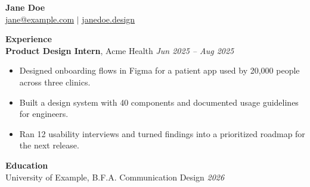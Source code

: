 \documentclass[10pt]{article}
\begin{document}
\begin{center}{\Large\textbf{Jane Doe}}\\ \href{mailto:jane@example.com}{jane@example.com} $|$ \href{https://janedoe.design}{janedoe.design}\end{center}
\textbf{Experience}\\
\textbf{Product Design Intern}, Acme Health \hfill \textit{Jun 2025 -- Aug 2025}
\begin{itemize}
\item Designed onboarding flows in Figma for a patient app used by 20,000 people across three clinics.
\item Built a design system with 40 components and documented usage guidelines for engineers.
\item Ran 12 usability interviews and turned findings into a prioritized roadmap for the next release.
\end{itemize}
\textbf{Education}\\
University of Example, B.F.A. Communication Design \hfill \textit{2026}
\end{document}
